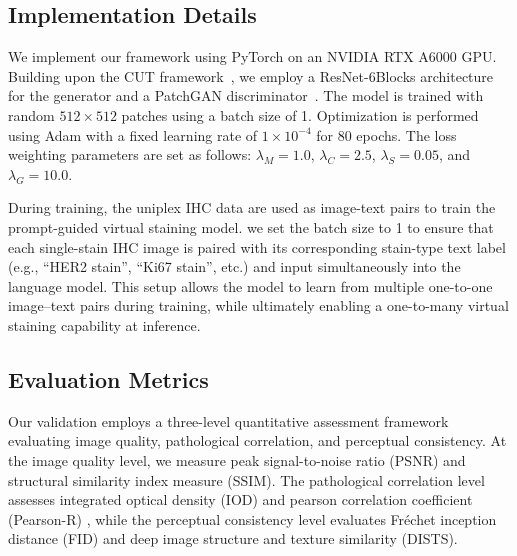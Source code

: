 \documentclass[journal,twoside,web]{ieeecolor}
\begin{document}
\subsection{Implementation Details}
We implement our framework using PyTorch on an NVIDIA RTX A6000 GPU. Building upon the CUT framework~\cite{park2020contrastive}, we employ a ResNet-6Blocks architecture for the generator and a PatchGAN discriminator~\cite{isola2017image}. The model is trained with random $512 \times 512$ patches using a batch size of 1. Optimization is performed using Adam with a fixed learning rate of $1 \times 10^{-4}$ for 80 epochs. The loss weighting parameters are set as follows: $\lambda_{M} = 1.0$, $\lambda_{C} = 2.5$, $\lambda_{S} = 0.05$, and $\lambda_{G} = 10.0$.

{During training, the uniplex IHC data are used as image-text pairs to train the prompt-guided virtual staining model. we set the batch size to 1 to ensure that each single-stain IHC image is paired with its corresponding stain-type text label (e.g., ``HER2 stain'', ``Ki67 stain'', etc.) and input simultaneously into the language model. This setup allows the model to learn from multiple one-to-one image–text pairs during training, while ultimately enabling a one-to-many virtual staining capability at inference.}

\subsection{Evaluation Metrics}
Our validation employs a three-level quantitative assessment framework evaluating image quality, pathological correlation, and perceptual consistency. At the image quality level, we measure peak signal-to-noise ratio (PSNR) and structural similarity index measure (SSIM). The pathological correlation level assesses integrated optical density (IOD) \cite{zhang2022mvfstain} and pearson correlation coefficient (Pearson-R) \cite{liu2021unpaired}, while the perceptual consistency level evaluates Fréchet inception distance (FID) and deep image structure and texture similarity (DISTS).%
 
\end{document}
